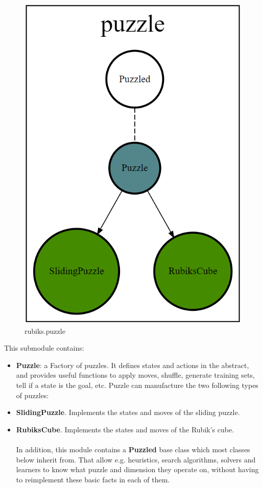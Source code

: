 \begin{figure}[H]
\centering
\includegraphics[scale=0.22]{./Figures/codebasepuzzle}
\caption[Codebase]{rubiks.puzzle}
\label{fig:Codebasepuzzle}
\end{figure}
This submodule contains:
\begin{itemize}
\item \textbf{Puzzle}: a Factory of puzzles. It defines states and actions in the abstract, and provides useful functions to apply moves, shuffle, generate training sets, tell if a state is the goal, etc. Puzzle can manufacture the two following types of puzzles:
\item \textbf{SlidingPuzzle}. Implements the states and moves of the sliding puzzle.
\item \textbf{RubiksCube}. Implements the states and moves of the Rubik's cube.
\\
\\
In addition, this module contains a \textbf{Puzzled} base class which most classes below inherit from. That allow e.g. heuristics, search algorithms, solvers and learners to know what puzzle and dimension they operate on, without having to reimplement these basic facts in each of them.
\end{itemize}

